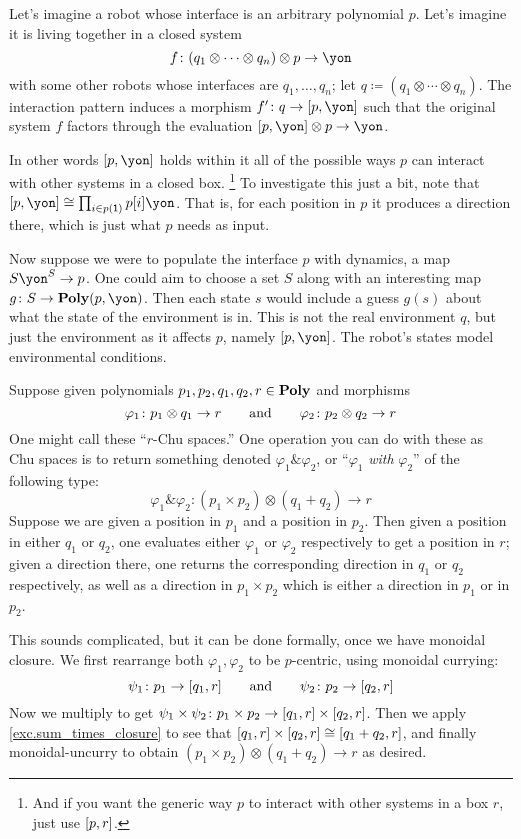 \documentclass[Book-Poly]{subfiles}
\begin{document}
\begin{example}
Let's imagine a robot whose interface is an arbitrary polynomial $p$. Let's imagine it is living together in a closed system
\[
	f\colon (q_1\otimes\cdots\otimes q_n)\otimes p\to \yon
\]
with some other robots whose interfaces are $q_1,\ldots,q_n$; let $q\coloneqq(q_1\otimes\cdots\otimes q_n)$. The interaction pattern induces a morphism $f'\colon q\to \ihom{p,\yon}$ such that the original system $f$ factors through the evaluation $\ihom{p,\yon}\otimes p\to \yon$.

In other words $\ihom{p,\yon}$ holds within it all of the possible ways $p$ can interact with other systems in a closed box.%
\footnote{And if you want the generic way $p$ to interact with other systems in a box $r$, just use $[p,r]$.}
To investigate this just a bit, note that $\ihom{p,\yon}\cong\prod_{i\in p(\1)}p[i]\yon$. That is, for each position in $p$ it produces a direction there, which is just what $p$ needs as input.

Now suppose we were to populate the interface $p$ with dynamics, a map $S\yon^S\to p$. One could aim to choose a set $S$ along with an interesting map $g\colon S\to\poly(p,\yon)$. Then each state $s$ would include a guess $g(s)$ about what the state of the environment is in. This is not the real environment $q$, but just the environment as it affects $p$, namely $\ihom{p,\yon}$. The robot's states model environmental conditions.
\end{example}

\begin{example}[Chu $\&$]
Suppose given polynomials $p_1,p_2,q_1,q_2,r\in\mathbf{Poly}$ and morphisms
\[
	\varphi_1\colon p_1\otimes q_1\to r
	\qquad\text{and}\qquad
	\varphi_2\colon p_2\otimes q_2\to r
\]
One might call these ``$r$-Chu spaces.'' One operation you can do with these as Chu spaces is to return something denoted $\varphi_1\&\varphi_2$, or ``$\varphi_1$ \emph{with} $\varphi_2$'' of the following type:
\[
\varphi_1\&\varphi_2\colon (p_1\times p_2)\otimes (q_1+q_2)\to r
\]
Suppose we are given a position in $p_1$ and a position in $p_2$. Then given a position in either $q_1$ or $q_2$, one evaluates either $\varphi_1$ or $\varphi_2$ respectively to get a position in $r$; given a direction there, one returns the corresponding direction in $q_1$ or $q_2$ respectively, as well as a direction in $p_1\times p_2$ which is either a direction in $p_1$ or in $p_2$.

This sounds complicated, but it can be done formally, once we have monoidal closure. We first rearrange both $\varphi_1,\varphi_2$ to be $p$-centric, using monoidal currying:
\[
\psi_1\colon p_1\to [q_1,r]
\qquad\text{and}\qquad
\psi_2\colon p_2\to [q_2,r]
\]
Now we multiply to get $\psi_1\times\psi_2\colon p_1\times p_2\to[q_1,r]\times[q_2,r]$. Then we apply \cref{exc.sum_times_closure} to see that $[q_1,r]\times[q_2,r]\cong[q_1+q_2,r]$, and finally monoidal-uncurry to obtain $(p_1\times p_2)\otimes(q_1+q_2)\to r$ as desired.
\end{example}
\end{document}
